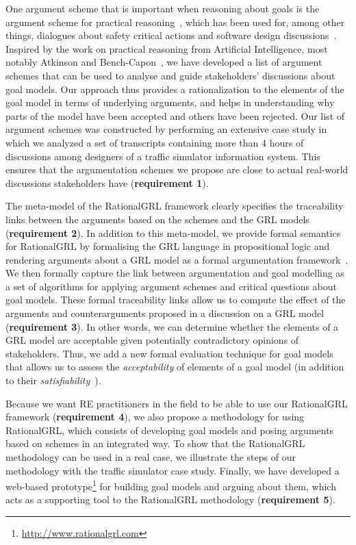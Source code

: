One argument scheme that is important when reasoning about goals is the argument scheme for practical reasoning~\cite{walton1990,atkinson2007}, which has been used for, among other things, dialogues about safety critical actions \cite{tolchinsky2012deliberation} and software design discussions~\cite{BlackEtal2013}. Inspired by the work on practical reasoning from Artificial Intelligence, most notably Atkinson and Bench-Capon~\cite{atkinson2007}, we have developed a list of argument schemes that can be used to analyse and guide stakeholders' discussions about goal models. Our approach thus provides a rationalization to the elements of the goal model in terms of underlying arguments, and helps in understanding why parts of the model have been accepted and others have been rejected. Our list of argument schemes was constructed by performing an extensive case study in which we analyzed a set of transcripts containing more than 4 hours of discussions among designers of a traffic simulator information system. This ensures that the argumentation schemes we propose are close to actual real-world discussions stakeholders have (\textbf{requirement 1}).  

The meta-model of the RationalGRL framework clearly specifies the traceability links between the arguments based on the schemes and the GRL models (\textbf{requirement 2}). In addition to this meta-model, we provide formal semantics for RationalGRL by formalising the GRL language in propositional logic and rendering arguments about a GRL model as a formal argumentation framework~\cite{Dung1995}. We then formally capture the link between argumentation and goal modelling as a set of algorithms for applying argument schemes and critical questions about goal models. These formal traceability links allow us to compute the effect of the arguments and counterarguments proposed in a discussion on a GRL model (\textbf{requirement 3}). In other words, we can determine whether the elements of a GRL model are acceptable given potentially contradictory opinions of stakeholders. Thus, we add a new formal evaluation technique for goal models that allows us to assess the \emph{acceptability} of elements of a goal model (in addition to their \emph{satisfiability}~\cite{Amyot:2010:EGM:1841349.1841356}).

Because we want RE practitioners in the field to be able to use our RationalGRL framework (\textbf{requirement 4}), we also propose a methodology for using RationalGRL, which consists of developing goal models and posing arguments based on schemes in an integrated way. To show that the RationalGRL methodology can be used in a real case, we illustrate the steps of our methodology with the traffic simulator case study. Finally, we have developed a web-based prototype\footnote{\url{http://www.rationalgrl.com}} for building goal models and arguing about them, which acts as a supporting tool to the RationalGRL methodology (\textbf{requirement 5}). 


